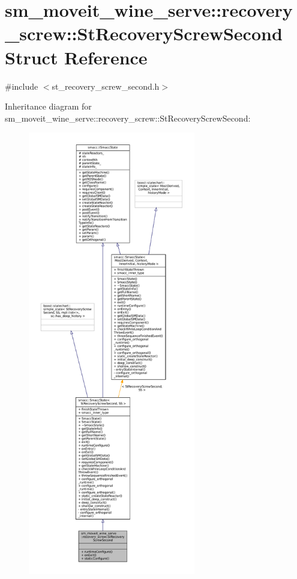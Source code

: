 \hypertarget{structsm__moveit__wine__serve_1_1recovery__screw_1_1StRecoveryScrewSecond}{}\section{sm\+\_\+moveit\+\_\+wine\+\_\+serve\+:\+:recovery\+\_\+screw\+:\+:St\+Recovery\+Screw\+Second Struct Reference}
\label{structsm__moveit__wine__serve_1_1recovery__screw_1_1StRecoveryScrewSecond}


{\ttfamily \#include $<$st\+\_\+recovery\+\_\+screw\+\_\+second.\+h$>$}



Inheritance diagram for sm\+\_\+moveit\+\_\+wine\+\_\+serve\+:\+:recovery\+\_\+screw\+:\+:St\+Recovery\+Screw\+Second\+:
\nopagebreak
\begin{figure}[H]
\begin{center}
\leavevmode
\includegraphics[height=550pt]{structsm__moveit__wine__serve_1_1recovery__screw_1_1StRecoveryScrewSecond__inherit__graph}
\end{center}
\end{figure}



